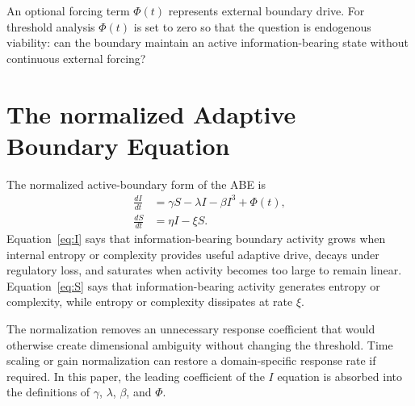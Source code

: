 \documentclass[11pt]{article}
\begin{document}
An optional forcing term $\Phi(t)$ represents external boundary drive. For threshold analysis $\Phi(t)$ is set to zero so that the question is endogenous viability: can the boundary maintain an active information-bearing state without continuous external forcing?

\section{The normalized Adaptive Boundary Equation}
The normalized active-boundary form of the ABE is
\begin{align}
\frac{dI}{dt}&=\gamma S-\lambda I-\beta I^3+\Phi(t), \label{eq:I}\\
\frac{dS}{dt}&=\eta I-\xi S. \label{eq:S}
\end{align}
Equation~\eqref{eq:I} says that information-bearing boundary activity grows when internal entropy or complexity provides useful adaptive drive, decays under regulatory loss, and saturates when activity becomes too large to remain linear. Equation~\eqref{eq:S} says that information-bearing activity generates entropy or complexity, while entropy or complexity dissipates at rate $\xi$.

The normalization removes an unnecessary response coefficient that would otherwise create dimensional ambiguity without changing the threshold. Time scaling or gain normalization can restore a domain-specific response rate if required. In this paper, the leading coefficient of the $I$ equation is absorbed into the definitions of $\gamma$, $\lambda$, $\beta$, and $\Phi$.
\end{document}
